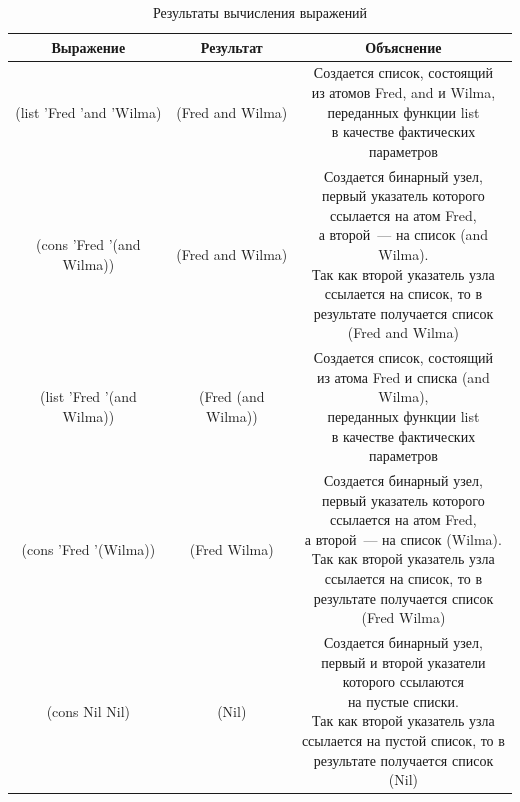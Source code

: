 \begin{center}
	\captionsetup{justification=raggedright,singlelinecheck=off}
	\begin{longtable}[c]{|c|c|c|}
		\caption{\label{4}Результаты вычисления выражений}\\
		\hline
		Выражение & Результат & Объяснение \\
		\hline
		(list 'Fred 'and 'Wilma) & (Fred and Wilma) & \specialcell{Создается список, состоящий\\из атомов Fred, and и Wilma,\\переданных функции list\\в качестве фактических\\параметров}\\
		\hline
		(cons 'Fred '(and Wilma)) & (Fred and Wilma) & \specialcell{Создается бинарный узел,\\первый указатель которого\\ссылается на атом Fred,\\а второй~--- на список (and Wilma).\\Так как второй указатель узла\\ссылается на список, то в\\результате получается список\\(Fred and Wilma)}\\
		\hline
		(list 'Fred '(and Wilma)) & (Fred (and Wilma)) & \specialcell{Создается список, состоящий\\из атома Fred и списка (and Wilma),\\переданных функции list\\в качестве фактических\\параметров}\\
		\hline
		(cons 'Fred '(Wilma)) & (Fred Wilma) & \specialcell{Создается бинарный узел,\\первый указатель которого\\ссылается на атом Fred,\\а второй~--- на список (Wilma).\\Так как второй указатель узла\\ссылается на список, то в\\результате получается список\\(Fred Wilma)}\\
		\hline
		(cons Nil Nil) & (Nil) & \specialcell{Создается бинарный узел,\\первый и второй указатели\\ которого ссылаются\\на пустые списки.\\Так как второй указатель узла\\ссылается на пустой список, то в\\результате получается список\\(Nil)}\\

\end{longtable}
\end{center}
